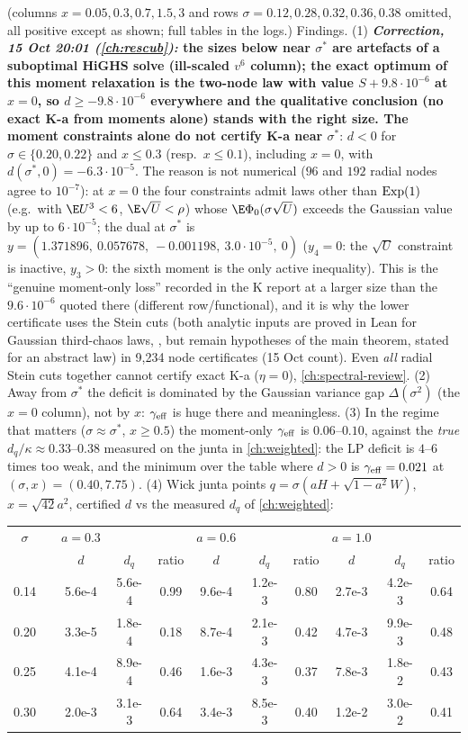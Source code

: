 (columns $x=0.05,0.3,0.7,1.5,3$ and rows $\sigma=0.12,0.28,0.32,0.36,0.38$ omitted, all positive except as shown; full tables in the logs.) Findings. (1) \textbf{\emph{Correction, 15 Oct 20:01 (\autoref{ch:rescub}):} the sizes below near $\sigma^*$ are artefacts of a suboptimal HiGHS solve (ill-scaled $v^6$ column); the exact optimum of this moment relaxation is the two-node law with value $S+9.8\cdot10^{-6}$ at $x=0$, so $d\ge-9.8\cdot10^{-6}$ everywhere and the qualitative conclusion (no exact K-a from moments alone) stands with the right size. The moment constraints alone do not certify K-a near $\sigma^*$}: $d<0$ for
$\sigma\in\{0.20,0.22\}$ and $x\le0.3$ (resp.\ $x\le0.1$), including $x=0$, with $d(\sigma^*,0)=-6.3\cdot10^{-5}$. The reason is not numerical ($96$ and $192$ radial nodes agree to $10^{-7}$): at
$x=0$ the four constraints admit laws other than ${\rm Exp}(1)$ (e.g.\ with $\E U^3<6$, $\E\sqrt U<\rho$) whose $\E\Phi_0(\sigma\sqrt U)$ exceeds the Gaussian value by up to $6\cdot10^{-5}$; the
dual at $\sigma^*$ is $y=(1.371896,\ 0.057678,\ -0.001198,\ 3.0\cdot10^{-5},\ 0)$ ($y_4=0$: the $\sqrt U$ constraint is inactive, $y_3>0$: the sixth moment is the only active inequality). This is
the ``genuine moment-only loss'' recorded in the K report at a larger size than the $9.6\cdot10^{-6}$ quoted there (different row/functional), and it is why the lower certificate uses the Stein
cuts (both analytic inputs are proved in Lean for Gaussian third-chaos laws, , but remain hypotheses of the main theorem, stated for an abstract law) in 9,234 node certificates (15 Oct count). Even \emph{all} radial Stein cuts together cannot certify exact K-a ($\eta=0$), \autoref{ch:spectral-review}. (2) Away from $\sigma^*$ the deficit is dominated by the Gaussian variance gap $\Delta(\sigma^2)$ (the $x=0$ column), not by $x$:
$\gamma_{\rm eff}$ is huge there and meaningless. (3) In the regime that matters ($\sigma\approx\sigma^*$, $x\ge0.5$) the moment-only $\gamma_{\rm eff}$ is $0.06$--$0.10$, against the
\emph{true} $d_q/\kappa\approx0.33$--$0.38$ measured on the junta in \autoref{ch:weighted}: the LP deficit is $4$--$6$ times too weak, and the minimum over the table where $d>0$ is
$\gamma_{\rm eff}=0.021$ at $(\sigma,x)=(0.40,7.75)$. (4) Wick junta points $q=\sigma(aH+\sqrt{1-a^2}W)$, $x=\sqrt{42}a^2$, certified $d$ vs the measured $d_q$ of \autoref{ch:weighted}:
\begin{center}\small
\begin{tabular}{cc|ccc|ccc|ccc}\toprule
$\sigma$ & & $a=0.3$ & & & $a=0.6$ & & & $a=1.0$ & & \\
 & & $d$ & $d_q$ & ratio & $d$ & $d_q$ & ratio & $d$ & $d_q$ & ratio\\\midrule
0.14 & & 5.6e-4 & 5.6e-4 & 0.99 & 9.6e-4 & 1.2e-3 & 0.80 & 2.7e-3 & 4.2e-3 & 0.64\\
0.20 & & 3.3e-5 & 1.8e-4 & 0.18 & 8.7e-4 & 2.1e-3 & 0.42 & 4.7e-3 & 9.9e-3 & 0.48\\
0.25 & & 4.1e-4 & 8.9e-4 & 0.46 & 1.6e-3 & 4.3e-3 & 0.37 & 7.8e-3 & 1.8e-2 & 0.43\\
0.30 & & 2.0e-3 & 3.1e-3 & 0.64 & 3.4e-3 & 8.5e-3 & 0.40 & 1.2e-2 & 3.0e-2 & 0.41\\\bottomrule
\end{tabular}
\end{center}
